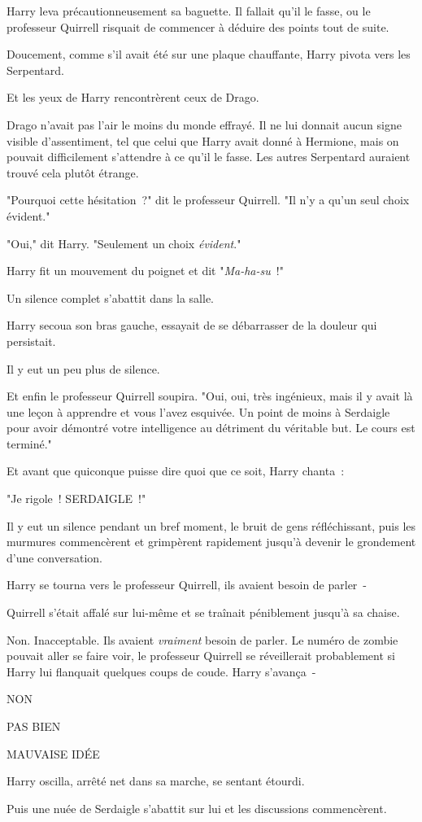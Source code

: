 Harry leva précautionneusement sa baguette. Il fallait qu'il le fasse, ou le professeur Quirrell risquait de commencer à déduire des points tout de suite.

Doucement, comme s'il avait été sur une plaque chauffante, Harry pivota vers les Serpentard.

Et les yeux de Harry rencontrèrent ceux de Drago.

Drago n'avait pas l'air le moins du monde effrayé. Il ne lui donnait aucun signe visible d'assentiment, tel que celui que Harry avait donné à Hermione, mais on pouvait difficilement s'attendre à ce qu'il le fasse. Les autres Serpentard auraient trouvé cela plutôt étrange.

"Pourquoi cette hésitation~?" dit le professeur Quirrell. "Il n'y a qu'un seul choix évident."

"Oui," dit Harry. "Seulement un choix \emph{évident}."

Harry fit un mouvement du poignet et dit "\emph{Ma-ha-su}~!"

Un silence complet s'abattit dans la salle.

Harry secoua son bras gauche, essayait de se débarrasser de la douleur qui persistait.

Il y eut un peu plus de silence.

Et enfin le professeur Quirrell soupira. "Oui, oui, très ingénieux, mais il y avait là une leçon à apprendre et vous l'avez esquivée. Un point de moins à Serdaigle pour avoir démontré votre intelligence au détriment du véritable but. Le cours est terminé."

Et avant que quiconque puisse dire quoi que ce soit, Harry chanta~:

"Je rigole~! SERDAIGLE~!"

Il y eut un silence pendant un bref moment, le bruit de gens réfléchissant, puis les murmures commencèrent et grimpèrent rapidement jusqu'à devenir le grondement d'une conversation.

Harry se tourna vers le professeur Quirrell, ils avaient besoin de parler~-

Quirrell s'était affalé sur lui-même et se traînait péniblement jusqu'à sa chaise.

Non. Inacceptable. Ils avaient \emph{vraiment} besoin de parler. Le numéro de zombie pouvait aller se faire voir, le professeur Quirrell se réveillerait probablement si Harry lui flanquait quelques coups de coude. Harry s'avança~-

NON

PAS BIEN

MAUVAISE IDÉE

Harry oscilla, arrêté net dans sa marche, se sentant étourdi.

Puis une nuée de Serdaigle s'abattit sur lui et les discussions commencèrent.~ 

